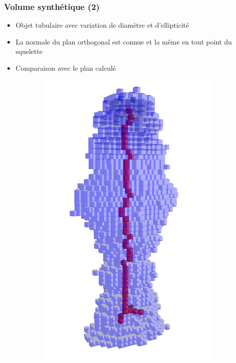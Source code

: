 \documentclass{beamer}
\begin{document}
\begin{frame}
	\frametitle{Volume synthétique (2)}
	\begin{itemize}
		\item Objet tubulaire avec variation de diamètre et d'ellipticité
		\item La normale du plan orthogonal est connue et la même en tout point du squelette
		\item Comparaison avec le plan calculé
	\end{itemize}
		\vspace{-0.3cm}
	\begin{figure}[h]
		\centering
		\begin{subfigure}[t]{0.5\textwidth}
			\centering
			\includegraphics[scale=0.15, clip, trim=0 0 0 0]{fig/skeleton_and_cylinder.png}

\end{subfigure}
\end{figure}
\end{frame}
\end{document}
